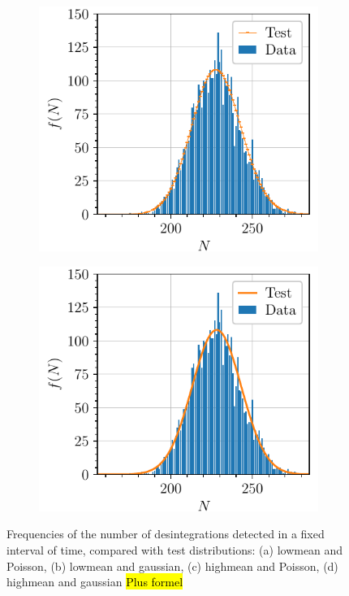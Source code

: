\begin{figure}[htbp]
\begin{subfigure}{0.495\textwidth}
        \includegraphics[scale=1]{figures/highmean_poisson.pdf}
        \caption{}
    \end{subfigure}
    \hfill
    \begin{subfigure}{0.495\textwidth}
        \includegraphics[scale=1]{figures/highmean_gaussian.pdf}
        \caption{}
    \end{subfigure}
    \caption{Frequencies of the number of desintegrations detected in a fixed interval of time, compared with test distributions: (a) lowmean and Poisson, (b) lowmean and gaussian, (c) highmean and Poisson, (d) highmean and gaussian \hl{Plus formel}}
    \label{fig:statistical_tests}
\end{figure}

